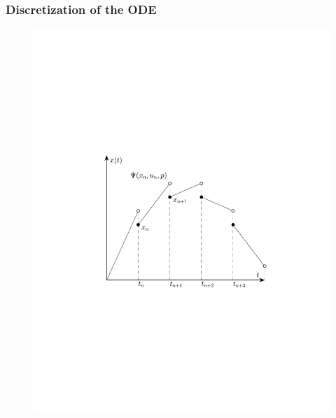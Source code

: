 \begin{frame}
	\frametitle{Discretization of the ODE}
	
	\begin{figure}[bth]
	  \begin{center}
	    \includegraphics[trim=1cm 5cm 0cm 8cm, clip=true, width=\linewidth]{img/multShootPlot}
	  \end{center}
	\end{figure}
\end{frame}





